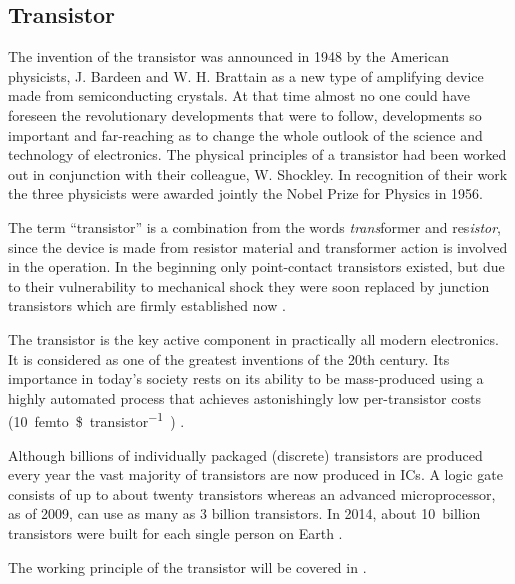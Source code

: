 \subsection{Transistor}
The invention of the transistor was announced in 1948 by the American physicists, J. Bardeen and W. H. Brattain as a new type of amplifying device made from semiconducting crystals. At that time almost no one could have foreseen the revolutionary developments that were to follow, developments so important and far-reaching as to change the whole outlook of the science and technology of electronics. The physical principles of a transistor had been worked out in conjunction with their colleague, W. Shockley. In recognition of their work the three physicists were awarded jointly the Nobel Prize for Physics in 1956.\par
%
%
The term ``transistor'' is a combination from the words \textit{trans}former and res\textit{istor}, since the device is made from resistor material and transformer action is involved in the operation. In the beginning only point-contact transistors existed, but due to their vulnerability to mechanical shock they were soon replaced by junction transistors which are firmly established now \cite{olsen}.\par
%
The transistor is the key active component in practically all modern electronics. It is considered as one of the greatest inventions of the 20th century. Its importance in today's society rests on its ability to be mass-produced using a highly automated process that achieves astonishingly low per-transistor costs (\SI{10}{femto\$\per transistor)} \cite{trans:1}.\par
%
Although billions of individually packaged (discrete) transistors are produced every year the vast majority of transistors are now produced in \acp{IC}. A logic gate consists of up to about twenty transistors whereas an advanced microprocessor, as of 2009, can use as many as 3 billion transistors. In 2014, about \SI{10}{billion} transistors were built for each single person on Earth \cite{trans:1}.\par
The working principle of the transistor will be covered in .

